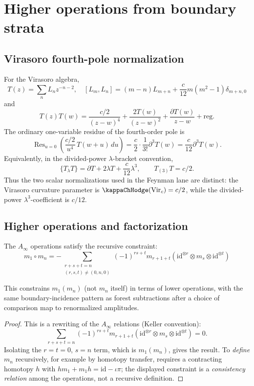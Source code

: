 \section{Higher operations from boundary strata}

\subsection{Virasoro fourth-pole normalization}

\begin{example}\label{ex:virasoro-fourth-pole}
For the Virasoro algebra,
\[T(z) = \sum_n L_n z^{-n-2}, \quad [L_m, L_n] = (m-n)L_{m+n} +
\frac{c}{12}m(m^2-1)\delta_{m+n,0}\]
and
\[T(z)T(w) = \frac{c/2}{(z-w)^4} + \frac{2T(w)}{(z-w)^2} +
\frac{\partial T(w)}{z-w}+\mathrm{reg}.
\]
The ordinary one-variable residue of the fourth-order pole is
\[
\operatorname{Res}_{u=0}
\left(\frac{c/2}{u^4}\,T(w+u)\,du\right)
=\frac{c}{2}\cdot\frac{1}{3!}\partial^3T(w)
=\frac{c}{12}\partial^3T(w).
\]
Equivalently, in the divided-power \(\lambda\)-bracket convention,
\[
\{T_\lambda T\}
=\partial T+2\lambda T+\frac{c}{12}\lambda^3,
\qquad
T_{(3)}T=c/2.
\]
Thus the two scalar normalizations used in the Feynman lane are
distinct: the Virasoro curvature parameter is
\(\kappaChHodge(\mathrm{Vir}_c)=c/2\), while the divided-power
\(\lambda^3\)-coefficient is \(c/12\).
\end{example}

\subsection{Higher operations and factorization}

\begin{theorem}
\label{thm:ainfty-constraint-formula}
The $A_\infty$ operations satisfy the recursive constraint:
\[m_1 \circ m_n = -\sum_{\substack{r+s+t=n \\ (r,s,t) \neq (0,n,0)}} (-1)^{rs+t} m_{r+1+t}(\mathrm{id}^{\otimes r} \otimes m_s \otimes \mathrm{id}^{\otimes t})\]

This constrains $m_1(m_n)$ (not $m_n$ itself) in terms of lower operations,
with the same boundary-incidence pattern as forest subtractions after a
choice of comparison map to renormalized amplitudes.
\end{theorem}

\begin{proof}
This is a rewriting of the $A_\infty$ relations (Keller convention):
\[\sum_{r+s+t=n} (-1)^{rs+t} m_{r+1+t}(\mathrm{id}^{\otimes r} \otimes m_s \otimes
\mathrm{id}^{\otimes t}) = 0.\]
Isolating the $r = t = 0$, $s = n$ term, which is $m_1(m_n)$, gives the result.
To \emph{define} $m_n$ recursively, for example by homotopy transfer,
requires a contracting homotopy $h$ with $h m_1 + m_1 h = \mathrm{id} - \iota\pi$;
the displayed constraint is a \emph{consistency relation} among the operations,
not a recursive definition.
\end{proof}

